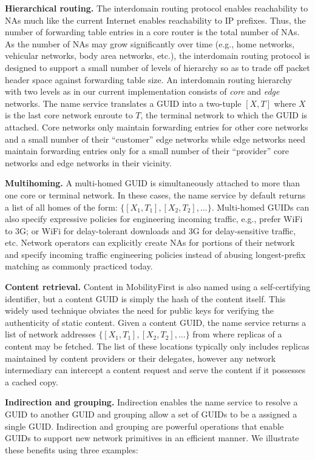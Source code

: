 \textbf{Hierarchical routing.} The interdomain routing protocol enables reachability to NAs much like the current Internet enables reachability to IP prefixes. Thus, the number of forwarding table entries in a core router is the total number of NAs. As the number of NAs may grow significantly over time (e.g., home networks, vehicular networks, body area networks, etc.), the interdomain routing protocol is designed to support a small number of levels of hierarchy so as to trade off packet header space against forwarding table size. An interdomain routing hierarchy with two levels as in our current implementation consists of  {\em core} and {\em edge} networks. The name service translates a GUID into a two-tuple $[X, T]$ where $X$ is the last core network enroute to $T$, the terminal network to which the GUID is attached. Core networks only maintain forwarding entries for other core networks and a small number of their ``customer'' edge networks while edge networks need maintain forwarding entries only for a small number of their ``provider'' core networks and edge networks in their vicinity.

\textbf{Multihoming.} A multi-homed GUID is simultaneously attached to more than one core or terminal network. In these cases, the name service by default returns a list of all homes of the form: $\{[X_1, T_1], [X_2, T_2], \ldots \}$. Multi-homed GUIDs can also specify expressive policies for engineering incoming traffic, e.g., prefer WiFi to 3G; or WiFi for delay-tolerant downloads and 3G for delay-sensitive traffic, etc. Network operators can explicitly create NAs for portions of their network and specify incoming traffic engineering policies instead of abusing longest-prefix matching as commonly practiced today.

\textbf{Content retrieval.} Content in MobilityFirst is also named using a self-certifying identifier, but a content GUID is simply the hash of the content itself. This widely used technique \cite{BitTorrent} obviates the need for public keys for verifying the authenticity of static content. Given a content GUID, the name service returns a list of network addresses $\{[X_1, T_1], [X_2, T_2], \ldots \}$ from where replicas of a content may be fetched. The list of these locations typically only includes replicas maintained by content providers or their delegates, however any network intermediary can intercept a content request and serve the content if it possesses a cached copy.

\textbf{Indirection and grouping.} Indirection enables the name service to resolve a GUID to another GUID and grouping allow a set of GUIDs to be a assigned a single GUID. Indirection and grouping are powerful operations that enable GUIDs to support new network primitives in an efficient manner. We illustrate these benefits using three examples: 

